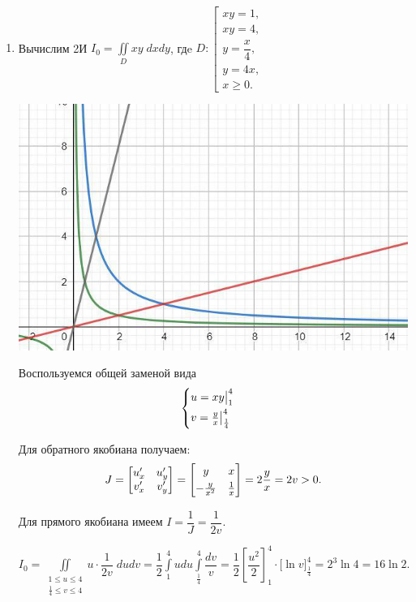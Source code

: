 \documentclass[../../main.tex]{subfiles}
\begin{document}
	\begin{examples}
~

		\begin{enumerate}
			\item
			Вычислим 2И $\displaystyle I_0 = \iint\limits_D xy\; dxdy$, гдe
			$D: \left[
			\begin{array}{l} 
			xy= 1,\\
			xy = 4,\\
			y = \dfrac{x}{4},\\
			y = 4x,\\
			x \geq 0.
			\end{array}
			\right.
			$
			
			\includegraphics[scale=0.85]{lec15_2}
			
			Воспользуемся общей заменой вида
			\[\begin{cases}
			\smallskip
			u = xy \big|_{1}^{4}\\
			v = \frac{y}{x} \big|_{\frac{1}{4}}^{4}
			\end{cases}\]
			
			Для обратного якобиана получаем: 
			\[J = \begin{bmatrix}
			u'_x & u'_y\\
			v'_x & 	v'_y
			\end{bmatrix} = \begin{bmatrix}
			\smallskip
			y & x\\
			-\frac{y}{x^2}& \frac{1}{x}
			\end{bmatrix} = 2 \dfrac{y}{x} = 2 v > 0.\]
			
			Для прямого якобиана имеем $I = \dfrac{1}{J} = \dfrac{1}{2v}$.
			
			$\displaystyle I_0 = \iint\limits_{\substack{
				1 \leq u \leq 4\\
				\frac{1}{4} \leq v \leq 4
				}} u \cdot \dfrac{1}{2v} \; du 
			dv = \dfrac{1}{2}\int\limits_{1}^{4} u du 
			\int\limits_{\frac{1}{4}}^{4} \dfrac{dv}{v} =
			 \dfrac{1}{2} \left[\dfrac{u ^ 2}{2}\right]_1^4 \cdot 
			 \big[ \ln{v}\big]_{\frac{1}{4}}^4 = 2^3 \ln{4} = 16 \ln{2}.$
			 

\end{enumerate}
\end{examples}
\end{document}

